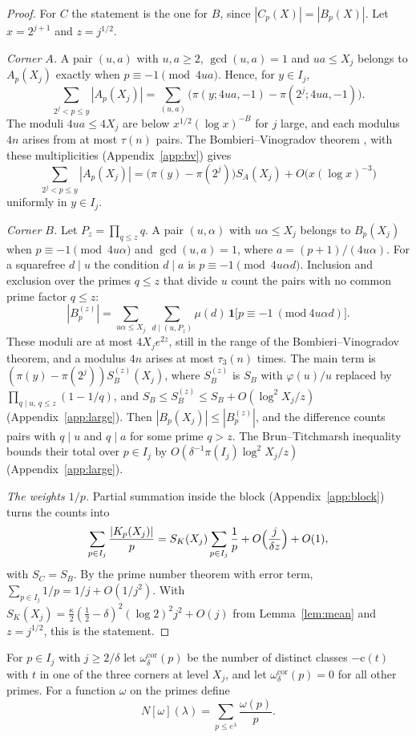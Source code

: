 \documentclass[aps,prd,twocolumn,superscriptaddress,nofootinbib,longbibliography,floatfix,showkeys,nobalancelastpage,amsmath,amssymb,10pt]{revtex4-2}
\theoremstyle{plain}
\theoremstyle{definition}
\theoremstyle{plain}
\newcommand{\cl}{\mathrm{c}}
\newcommand{\one}{\mathbf{1}}
\begin{document}
\begin{proof}
For $C$ the statement is the one for $B$, since $|C_p(X)|=|B_p(X)|$. Let $x=2^{j+1}$ and $z=j^{1/2}$.

\emph{Corner $A$.} A pair $(u,a)$ with $u,a\ge2$, $\gcd(u,a)=1$ and $ua\le X_j$ belongs to $A_p(X_j)$ exactly when $p\equiv-1\pmod{4ua}$. Hence, for $y\in I_j$,
\[
\sum_{2^j<p\le y}|A_p(X_j)|=\sum_{(u,a)}\bigl(\pi(y;4ua,-1)-\pi(2^j;4ua,-1)\bigr).
\]
The moduli $4ua\le4X_j$ are below $x^{1/2}(\log x)^{-B}$ for $j$ large, and each modulus $4n$ arises from at most $\tau(n)$ pairs. The Bombieri--Vinogradov theorem \cite{Bom}, \cite[Chapter~28]{Dav} with these multiplicities (Appendix~\ref{app:bv}) gives
\[
\sum_{2^j<p\le y}|A_p(X_j)|=\bigl(\pi(y)-\pi(2^j)\bigr)S_A(X_j)+O\bigl(x(\log x)^{-3}\bigr)
\]
uniformly in $y\in I_j$.

\emph{Corner $B$.} Let $P_z=\prod_{q\le z}q$. A pair $(u,\alpha)$ with $u\alpha\le X_j$ belongs to $B_p(X_j)$ when $p\equiv-1\pmod{4u\alpha}$ and $\gcd(u,a)=1$, where $a=(p+1)/(4u\alpha)$. For a squarefree $d\mid u$ the condition $d\mid a$ is $p\equiv-1\pmod{4u\alpha d}$. Inclusion and exclusion over the primes $q\le z$ that divide $u$ count the pairs with no common prime factor $q\le z$:
\[
|B^{(z)}_p|=\sum_{u\alpha\le X_j}\ \sum_{d\mid(u,P_z)}\mu(d)\,\one\bigl[p\equiv-1\ (\mathrm{mod}\ 4u\alpha d)\bigr].
\]
These moduli are at most $4X_je^{2z}$, still in the range of the Bombieri--Vinogradov theorem, and a modulus $4n$ arises at most $\tau_3(n)$ times. The main term is $(\pi(y)-\pi(2^j))S_B^{(z)}(X_j)$, where $S_B^{(z)}$ is $S_B$ with $\varphi(u)/u$ replaced by $\prod_{q\mid u,\,q\le z}(1-1/q)$, and $S_B\le S_B^{(z)}\le S_B+O(\log^2X_j/z)$ (Appendix~\ref{app:large}). Then $|B_p(X_j)|\le|B^{(z)}_p|$, and the difference counts pairs with $q\mid u$ and $q\mid a$ for some prime $q>z$. The Brun--Titchmarsh inequality \cite{MV} bounds their total over $p\in I_j$ by $O(\delta^{-1}\pi(I_j)\log^2X_j/z)$ (Appendix~\ref{app:large}).

\emph{The weights $1/p$.} Partial summation inside the block (Appendix~\ref{app:block}) turns the counts into
\[
\sum_{p\in I_j}\frac{|K_p(X_j)|}{p}=S_K(X_j)\sum_{p\in I_j}\frac1p+O\Bigl(\frac{j}{\delta z}\Bigr)+O(1),
\]
with $S_C=S_B$. By the prime number theorem with error term, $\sum_{p\in I_j}1/p=1/j+O(1/j^2)$. With $S_K(X_j)=\frac\kappa2(\frac12-\delta)^2(\log2)^2j^2+O(j)$ from Lemma~\ref{lem:mean} and $z=j^{1/2}$, this is the statement.
\end{proof}

For $p\in I_j$ with $j\ge2/\delta$ let $\omega^{\mathrm{cor}}_\delta(p)$ be the number of distinct classes $-\cl(t)$ with $t$ in one of the three corners at level $X_j$, and let $\omega^{\mathrm{cor}}_\delta(p)=0$ for all other primes. For a function $\omega$ on the primes define
\begin{equation}\label{eq:N}
N[\omega](\lambda)=\sum_{p\le e^\lambda}\frac{\omega(p)}p.
\end{equation}
\end{document}
